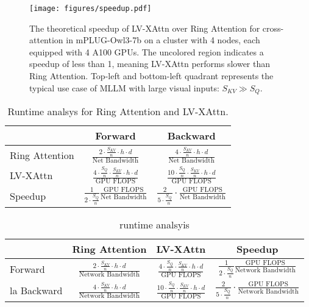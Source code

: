 \begin{figure}[t]
    \centering
    \texttt{[image: figures/speedup.pdf]}
    \caption{The theoretical speedup of LV-XAttn over Ring Attention for cross-attention in mPLUG-Owl3-7b on a cluster with 4 nodes, each equipped with 4 A100 GPUs. The uncolored region indicates a speedup of less than 1, meaning LV-XAttn performs slower than Ring Attention. Top-left and bottom-left quadrant represents the typical use case of MLLM with large visual inputs: $S_{KV} \gg S_Q$.}
    \label{fig:speedup}
\end{figure}
\begin{table}[tbp]
    \centering
    \begin{tabular}{l|c|c}
        \hline
         & Forward & Backward \\ \hline 
        Ring Attention & $\frac{2\cdot\frac{S_{KV}}{n}\cdot h\cdot d}{\text{Net Bandwidth}}$ & $\frac{4\cdot\frac{S_{KV}}{n}\cdot h\cdot d}{\text{Net Bandwidth}}$ \\[7pt]
        LV-XAttn & $\frac{4\cdot\frac{S_Q}{n}\cdot\frac{S_{KV}}{n}\cdot h\cdot d}{\text{GPU FLOPS}}$ & $\frac{10\cdot\frac{S_Q}{n}\cdot\frac{S_{KV}}{n}\cdot h\cdot d}{\text{GPU FLOPS}}$ \\[7pt]
        Speedup & $\frac{1}{2\cdot\frac{S_Q}{n}}\frac{\text{GPU FLOPS}}{\text{Net Bandwidth}}$ & $\frac{2}{5\cdot\frac{S_Q}{n}}\cdot\frac{\text{GPU FLOPS}}{\text{Net Bandwidth}}$ \\ [7pt]\hline
    \end{tabular}
    \caption{Runtime analsys for Ring Attention and LV-XAttn.}
    \label{tab:runtime-formula}
\end{table}
\begin{table}[tbp]
    \centering
    \begin{tabular}{l|c|c|c}
        \hline
         & Ring Attention & LV-XAttn & Speedup\\ \hline
        Forward & $\frac{2\cdot\frac{S_{KV}}{n}\cdot h\cdot d}{\text{Network Bandwidth}}$ & $\frac{4\cdot\frac{S_Q}{n}\cdot\frac{S_{KV}}{n}\cdot h\cdot d}{\text{GPU FLOPS}}$ & $\frac{1}{2\cdot\frac{S_Q}{n}}\frac{\text{GPU FLOPS}}{\text{Network Bandwidth}}$ \\la
        Backward & $\frac{4\cdot\frac{S_{KV}}{n}\cdot h\cdot d}{\text{Network Bandwidth}}$ & $\frac{10\cdot\frac{S_Q}{n}\cdot\frac{S_{KV}}{n}\cdot h\cdot d}{\text{GPU FLOPS}}$ & $\frac{2}{5\cdot\frac{S_Q}{n}}\cdot\frac{\text{GPU FLOPS}}{\text{Network Bandwidth}}$ \\
    \end{tabular}
    \caption{runtime analsyis}
    \label{tab:runtime-formula}
\end{table}
